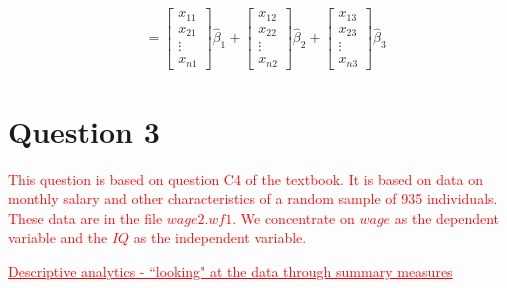 \documentclass[12pt]{report}
\begin{document}
\begin{align*}
&=
\begin{bmatrix}
x_{11} \\
x_{21} \\
\vdots \\
x_{n1} 
\end{bmatrix}
\hat{\beta}_1
+
\begin{bmatrix}
x_{12} \\
x_{22} \\
\vdots \\
x_{n2} 
\end{bmatrix}
\hat{\beta}_2
+
\begin{bmatrix}
x_{13} \\
x_{23} \\
\vdots \\
x_{n3} 
\end{bmatrix}
\hat{\beta}_3
\end{align*}

\newpage
\section*{Question 3}
\noindent \textcolor{red}{This question is based on question C4 of the textbook. It is based on data on monthly salary and other characteristics of a random sample of 935 individuals. These data are in the file $wage2.wf1$. We concentrate on $wage$ as the dependent variable and the $IQ$ as the independent variable.}

\noindent \textcolor{red}{\underline{Descriptive analytics - ``looking" at the data through summary measures}}
\end{document}
